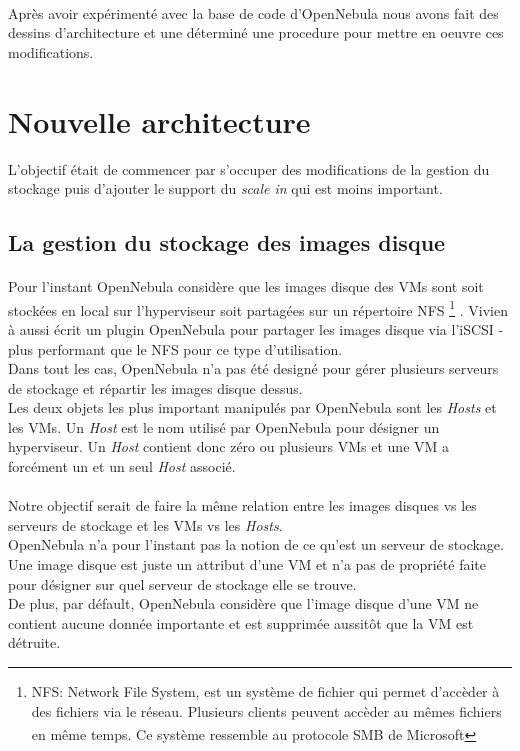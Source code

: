 \paragraph*{}
Après avoir expérimenté avec la base de code d'OpenNebula nous avons fait des dessins d'architecture et une déterminé une procedure pour mettre en oeuvre ces
modifications.


\section{Nouvelle architecture}

L'objectif était de commencer par s'occuper des modifications de la gestion du stockage puis d'ajouter le support du \emph{scale in} qui est moins important.

\subsection{La gestion du stockage des images disque}
\paragraph*{}
Pour l'instant OpenNebula considère que les images disque des VMs sont soit stockées en local sur l'hyperviseur soit partagées sur un répertoire NFS
	\footnote{NFS: Network File System, est un système de fichier qui permet d'accèder à des fichiers via le réseau. Plusieurs clients peuvent accèder
	au mêmes fichiers en même temps. Ce système ressemble au protocole SMB de Microsoft\textsuperscript{\textregistered}}
.
Vivien à aussi écrit un plugin OpenNebula pour partager les images disque via l'iSCSI - plus performant que le NFS pour ce type d'utilisation.
\\
Dans tout les cas, OpenNebula n'a pas été designé pour gérer plusieurs serveurs de stockage et répartir les images disque dessus.
\\
Les deux objets les plus important manipulés par OpenNebula sont les \emph{Hosts} et les VMs. Un \emph{Host} est le nom utilisé par OpenNebula pour
désigner un hyperviseur.
Un \emph{Host} contient donc zéro ou plusieurs VMs et une VM a forcément un et un seul \emph{Host} associé.


\paragraph*{}
Notre objectif serait de faire la même relation entre les images disques vs les serveurs de stockage et les VMs vs les \emph{Hosts}.
\\
OpenNebula n'a pour l'instant pas la notion de ce qu'est un serveur de stockage. Une image disque est juste un attribut d'une VM et n'a
pas de propriété faite pour désigner sur quel serveur de stockage elle se trouve.\\
De plus, par défault, OpenNebula considère que l'image disque d'une VM ne contient aucune donnée importante et est supprimée aussitôt
que la VM est détruite.

